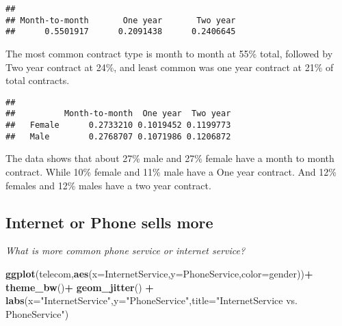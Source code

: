 \documentclass[]{article}
\newenvironment{Shaded}{\begin{snugshade}}{\end{snugshade}}
\newcommand{\KeywordTok}[1]{\textcolor[rgb]{0.13,0.29,0.53}{\textbf{#1}}}
\newcommand{\DataTypeTok}[1]{\textcolor[rgb]{0.13,0.29,0.53}{#1}}
\newcommand{\StringTok}[1]{\textcolor[rgb]{0.31,0.60,0.02}{#1}}
\newcommand{\OperatorTok}[1]{\textcolor[rgb]{0.81,0.36,0.00}{\textbf{#1}}}
\newcommand{\NormalTok}[1]{#1}
\begin{document}
\begin{Shaded}
\end{Shaded}

\begin{verbatim}
## 
## Month-to-month       One year       Two year 
##      0.5501917      0.2091438      0.2406645
\end{verbatim}

The most common contract type is month to month at 55\% total, followed
by Two year contract at 24\%, and least common was one year contract at
21\% of total contracts.

\begin{Shaded}
\end{Shaded}

\begin{verbatim}
##         
##          Month-to-month  One year  Two year
##   Female      0.2733210 0.1019452 0.1199773
##   Male        0.2768707 0.1071986 0.1206872
\end{verbatim}

The data shows that about 27\% male and 27\% female have a month to
month contract. While 10\% female and 11\% male have a One year
contract. And 12\% females and 12\% males have a two year contract.

\subsection{Internet or Phone sells
more}\label{internet-or-phone-sells-more}

\emph{What is more common phone service or internet service?}

\begin{Shaded}
\begin{Highlighting}[]
\KeywordTok{ggplot}\NormalTok{(telecom,}\KeywordTok{aes}\NormalTok{(}\DataTypeTok{x=}\NormalTok{InternetService,}\DataTypeTok{y=}\NormalTok{PhoneService,}\DataTypeTok{color=}\NormalTok{gender))}\OperatorTok{+}
\StringTok{  }\KeywordTok{theme_bw}\NormalTok{()}\OperatorTok{+}
\StringTok{  }\KeywordTok{geom_jitter}\NormalTok{() }\OperatorTok{+}
\StringTok{  }\KeywordTok{labs}\NormalTok{(}\DataTypeTok{x=}\StringTok{"InternetService"}\NormalTok{,}\DataTypeTok{y=}\StringTok{"PhoneService"}\NormalTok{,}\DataTypeTok{title=}\StringTok{"InternetService vs. PhoneService"}\NormalTok{)}
\end{Highlighting}
\end{Shaded}
\end{document}
